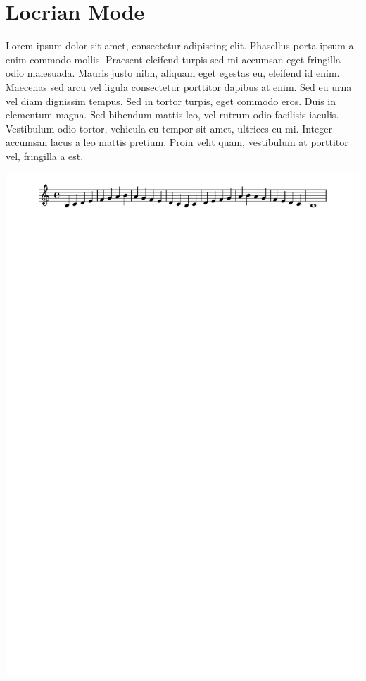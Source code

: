 \documentclass[11pt]{article}
\begin{document}
\section*{Locrian Mode}
\label{sec:org90ab8b5}

Lorem ipsum dolor sit amet, consectetur adipiscing elit. Phasellus
porta ipsum a enim commodo mollis. Praesent eleifend turpis sed mi
accumsan eget fringilla odio malesuada. Mauris justo nibh, aliquam
eget egestas eu, eleifend id enim. Maecenas sed arcu vel ligula
consectetur porttitor dapibus at enim. Sed eu urna vel diam dignissim
tempus. Sed in tortor turpis, eget commodo eros. Duis in elementum
magna. Sed bibendum mattis leo, vel rutrum odio facilisis iaculis.
Vestibulum odio tortor, vehicula eu tempor sit amet, ultrices eu mi.
Integer accumsan lacus a leo mattis pretium. Proin velit quam,
vestibulum at porttitor vel, fringilla a est.

\begin{center}
\includegraphics[width=.9\linewidth]{locrian.pdf}
\end{center}
\end{document}
